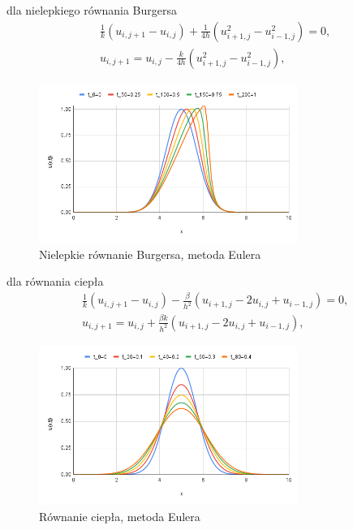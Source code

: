 \documentclass[12pt, a4paper]{article}
\begin{document}
dla nielepkiego równania Burgersa
\begin{equation}
\begin{split}
& \frac{1}{k}(u_{i,j+1}-u_{i,j})+\frac{1}{4h}(u_{i+1,j}^{2}-u_{i-1,j}^{2})=0,\\
& u_{i,j+1}=u_{i,j}-\frac{k}{4h}(u_{i+1,j}^{2}-u_{i-1,j}^{2}),
\end{split}
\end{equation}
\begin{figure}[h]
\caption{Nielepkie równanie Burgersa, metoda Eulera}
\centering
\includegraphics[width=0.75\textwidth]{1}
\end{figure}
\newpage

dla równania ciepła
\begin{equation}
\begin{split}
& \frac{1}{k}(u_{i,j+1}-u_{i,j})-\frac{\beta}{h^{2}}(u_{i+1,j}-2u_{i,j}+u_{i-1,j})=0,\\
& u_{i,j+1}=u_{i,j}+\frac{\beta k}{h^{2}}(u_{i+1,j}-2u_{i,j}+u_{i-1,j}),
\end{split}
\end{equation}
\begin{figure}[h]
\caption{Równanie ciepła, metoda Eulera}
\centering
\includegraphics[width=0.75\textwidth]{2}
\end{figure}
\end{document}
